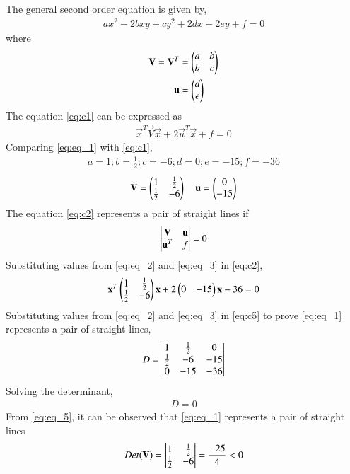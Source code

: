 \documentclass[journal,12pt,twocolumn]{IEEEtran}
\begin{document}
The general second order equation is given by,
\begin{align} \label{eq:c1}
    ax^2+2bxy+cy^2+2dx+2ey+f=0 
\end{align}
where
\begin{align}
    \mathbf{V}=\mathbf{V}^T&=\begin{pmatrix}a & b \\ b & c\end{pmatrix} \label{eq:c3}\\
    \mathbf{u}&=\begin{pmatrix}d \\ e\end{pmatrix} \label{eq:c4}
\end{align}
The equation \eqref{eq:c1} can be expressed as
\begin{align} \label{eq:c2}
    \vec{x}^T\vec{V}\vec{x}+2\vec{u}^T\vec{x}+f=0
\end{align}
Comparing \eqref{eq:eq_1} with \eqref{eq:c1}, 
\begin{align} \label{eq:eq_2}
    a=1;b=\frac{1}{2};c=-6;d=0;e=-15;f=-36  
\end{align}
\begin{align} \label{eq:eq_3}
    \mathbf{V} = \begin{pmatrix}1 & \frac{1}{2} \\ \frac{1}{2} & -6\end{pmatrix} \quad \mathbf{u} = \begin{pmatrix}0 \\ -15\end{pmatrix} 
\end{align}
The equation \eqref{eq:c2} represents a pair of straight lines if
\begin{align} \label{eq:c5}
    \begin{vmatrix}\mathbf{V} & \mathbf{u} \\ \mathbf{u}^T & f\end{vmatrix} = 0
\end{align}
Substituting values from \eqref{eq:eq_2} and \eqref{eq:eq_3} in \eqref{eq:c2},
\begin{align} \label{eq:eq_4}
    \mathbf{x}^T\begin{pmatrix}1 & \frac{1}{2} \\ \frac{1}{2} & -6\end{pmatrix}\mathbf{x} +2\begin{pmatrix}0 & -15\end{pmatrix}\mathbf{x}-36=0
\end{align}
Substituting values from \eqref{eq:eq_2} and \eqref{eq:eq_3} in \eqref{eq:c5} to prove \eqref{eq:eq_1} represents a pair of straight lines,
\begin{align} 
    D = \begin{vmatrix}1 & \frac{1}{2} & 0 \\ \frac{1}{2} & -6 & -15 \\ 0 & -15 & -36\end{vmatrix} \nonumber
\end{align}
Solving the determinant,
\begin{align} \label{eq:eq_5}
    D = 0
\end{align}
From \eqref{eq:eq_5}, it can be observed that \eqref{eq:eq_1} represents a pair of straight lines
\begin{align} \label{eq:eq_6}
    Det(\mathbf{V}) = \begin{vmatrix}1 & \frac{1}{2} \\ \frac{1}{2} & -6\end{vmatrix} = \frac{-25}{4} < 0
\end{align}
\end{document}
